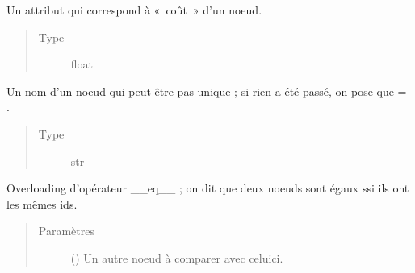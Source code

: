 \documentclass[letterpaper,10pt,french]{sphinxmanual}
\begin{document}
\begin{fulllineitems}
\begin{fulllineitems}
\end{fulllineitems}


\begin{fulllineitems}
\label{\detokenize{index:StrategyTree.NodeST._cost}}
Un attribut qui correspond à « coût » d’un noeud.
\begin{quote}\begin{description}
\item[{Type}] \leavevmode
float

\end{description}\end{quote}

\end{fulllineitems}


\begin{fulllineitems}
\label{\detokenize{index:StrategyTree.NodeST._name}}
Un nom d’un noeud qui peut être pas unique ; si rien a été passé, on pose que  = .
\begin{quote}\begin{description}
\item[{Type}] \leavevmode
str

\end{description}\end{quote}

\end{fulllineitems}


\begin{fulllineitems}
\label{\detokenize{index:StrategyTree.NodeST.__eq__}}
Overloading d’opérateur \_\_eq\_\_ ; on dit que deux noeuds sont égaux ssi ils ont les mêmes ids.
\begin{quote}\begin{description}
\item[{Paramètres}] \leavevmode
{} ({\hyperref[\detokenize{index:StrategyTree.NodeST}]{}}) \textendash{} Un autre noeud à comparer avec celui\sphinxhyphen{}ci.


\end{description}
\end{quote}
\end{fulllineitems}
\end{fulllineitems}
\end{document}
